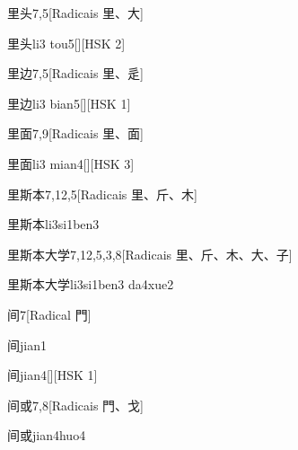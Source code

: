 \begin{entry}{里头}{7,5}[Radicais ⾥、⼤]
  \begin{phonetics}{里头}{li3 tou5}[][HSK 2]
  \end{phonetics}
\end{entry}

\begin{entry}{里边}{7,5}[Radicais ⾥、⾡]
  \begin{phonetics}{里边}{li3 bian5}[][HSK 1]
  \end{phonetics}
\end{entry}

\begin{entry}{里面}{7,9}[Radicais ⾥、⾯]
  \begin{phonetics}{里面}{li3 mian4}[][HSK 3]
  \end{phonetics}
\end{entry}

\begin{entry}{里斯本}{7,12,5}[Radicais ⾥、⽄、⽊]
  \begin{phonetics}{里斯本}{li3si1ben3}
  \end{phonetics}
\end{entry}

\begin{entry}{里斯本大学}{7,12,5,3,8}[Radicais ⾥、⽄、⽊、⼤、⼦]
  \begin{phonetics}{里斯本大学}{li3si1ben3 da4xue2}
  \end{phonetics}
\end{entry}

\begin{entry}{间}{7}[Radical ⾨]
  \begin{phonetics}{间}{jian1}
  \end{phonetics}
  \begin{phonetics}{间}{jian4}[][HSK 1]
  \end{phonetics}
\end{entry}

\begin{entry}{间或}{7,8}[Radicais ⾨、⼽]
  \begin{phonetics}{间或}{jian4huo4}
  \end{phonetics}
\end{entry}

